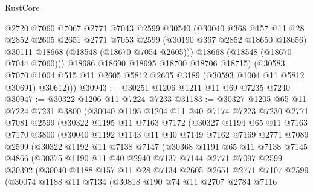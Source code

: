 \begin{lexlean}{RustCore}
\begin{coremodule}
            @2720
            @7060
            @7067
            @2771
            @7043
            @2599
            @30540
            (@30040
              @368
              @157
              @11
              @28
              @2852
              @2605
              @2651
              @2771
              @7053
              @2599
              (@30190 @367 @2852 @18650 @18656)
              @30111
              @18668
              (@18548 (@18670 @7054 @2605)))
            @18668
            (@18548 (@18670 @7044 @7060)))
          @18686
          @18690
          @18695
          @18700
          @18706
          @18715)
        (@30583
          @7070
          @1004
          @515
          @11
          @2605
          @5812
          @2605
          @3189
          (@30593 @1004 @11 @5812 @30691)
          @30612)))
@30943 := @30251 @1206 @1211 @11 @69 @7235 @7240
@30947 := @30322 @1206 @11 @7224 @7233
@31183 := @30327
    @1205
    @65
    @11
    @7224
    @7231
    @3800
    (@30040
      @1195
      @1204
      @11
      @40
      @7174
      @7223
      @7230
      @2771
      @7081
      @2599
      (@30322
        @1195
        @11
        @7163
        @7172
        (@30327
          @1194
          @65
          @11
          @7163
          @7170
          @3800
          (@30040
            @1192
            @1143
            @11
            @40
            @7149
            @7162
            @7169
            @2771
            @7089
            @2599
            (@30322
              @1192
              @11
              @7138
              @7147
              (@30368
                @1191
                @65
                @11
                @7138
                @7145
                @4866
                (@30375
                  @1190
                  @11
                  @40
                  @2940
                  @7137
                  @7144
                  @2771
                  @7097
                  @2599
                  @30392
                  (@30040
                    @1188
                    @157
                    @11
                    @28
                    @7134
                    @2605
                    @2651
                    @2771
                    @7107
                    @2599
                    (@30074
                      @1188
                      @11
                      @7134
                      (@30818
                        @190
                        @74
                        @11
                        @2707
                        @2784
                        @7116

\end{coremodule}
\end{lexlean}
